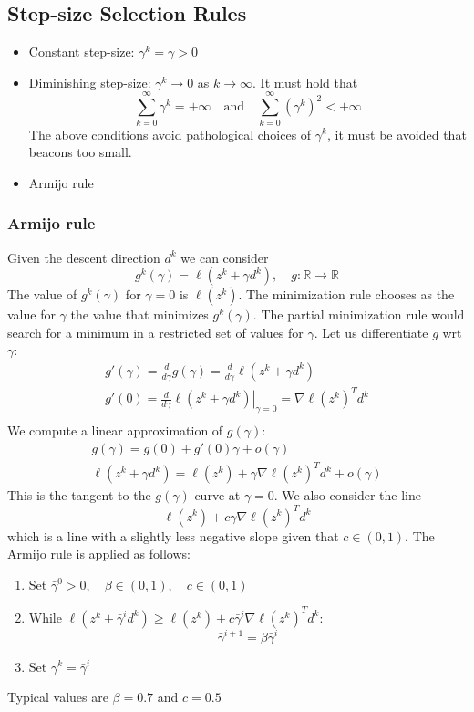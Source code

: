 \documentclass[openany]{book}
\newcommand\at[2]{\left.#1\right|_{#2}}    %
\newcommand{\R}{\mathbb{R}}                %
\theoremstyle{definition}
\theoremstyle{remark}
\begin{document}
\subsection{Step-size Selection Rules}
\begin{itemize}
    \item Constant step-size: $\gamma^k=\gamma>0$
    \item Diminishing step-size: $\gamma^k\to 0$ as $k\to\infty$. It must hold that \[
            \displaystyle\sum_{k=0}^{\infty}\gamma^k = +\infty \quad \text{and} \quad \displaystyle\sum_{k=0}^{\infty}(\gamma^k)^2 < +\infty
        \]
        The above conditions avoid pathological choices of $\gamma^k$, it must be avoided that beacons too small.
    \item Armijo rule
\end{itemize}

\subsubsection{Armijo rule}
Given the descent direction $d^k$ we can consider 
\[
    g^k(\gamma) = \ell(z^k+\gamma d^k), \quad g:\R\to\R
\]
The value of $g^k(\gamma)$ for $\gamma=0$ is $\ell(z^k)$. The minimization rule chooses as the value for $\gamma$ the value that minimizes $g^k(\gamma)$. The partial minimization rule would search for a minimum in a restricted set of values for $\gamma$. Let us differentiate $g$ wrt $\gamma$:
\begin{gather*}
    g'(\gamma)=\displaystyle\frac{d}{d\gamma}g(\gamma)=\displaystyle\frac{d}{d\gamma}\ell(z^k+\gamma d^k)\\
    g'(0) = \displaystyle\frac{d}{d\gamma}\at{\ell(z^k+\gamma d^k)}{\gamma=0} = \nabla \ell(z^k)^Td^k\\
\end{gather*}
We compute a linear approximation of $g(\gamma)$:
\begin{gather*}
    g(\gamma) = g(0) + g'(0)\gamma+o(\gamma)\\
    \ell(z^k+\gamma d^k) = \ell(z^k)+\gamma \nabla\ell(z^k)^Td^k + o(\gamma)
\end{gather*}
This is the tangent to the $g(\gamma)$ curve at $\gamma=0$. We also consider the line 
\[
    \ell(z^k)+c\gamma\nabla\ell(z^k)^Td^k
\]
which is a line with a slightly less negative slope given that $c\in(0,1)$.
The Armijo rule is applied as follows: 
\begin{enumerate}
    \item Set $\bar{\gamma}^0>0,\quad\beta\in(0,1),\quad c\in(0,1)$
    \item While $\ell(z^k+\bar{\gamma}^id^k)\geq \ell(z^k)+c\bar{\gamma}^i\nabla\ell(z^k)^Td^k$:
        \[
            \bar{\gamma}^{i+1}=\beta\bar{\gamma}^i
        \]
    \item Set $\gamma^k = \bar{\gamma}^i$
\end{enumerate}
Typical values are $\beta=0.7$ and $c=0.5$
\end{document}
